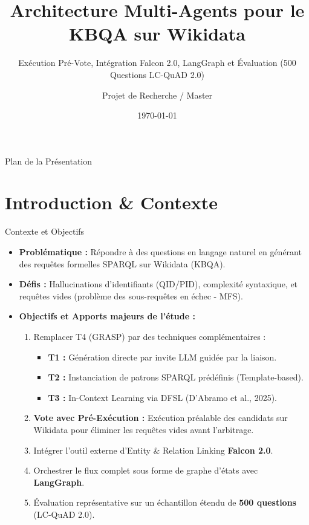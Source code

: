 \documentclass[10pt,aspectratio=169]{beamer}
\title[KBQA Multi-Agents sur Wikidata]{Architecture Multi-Agents pour le KBQA sur Wikidata}
\subtitle{Exécution Pré-Vote, Intégration Falcon 2.0, LangGraph et Évaluation (500 Questions LC-QuAD 2.0)}
\author{Projet de Recherche / Master}
\institute{Université de Dschang}
\date{\today}
\begin{document}
\begin{frame}
  \titlepage
\end{frame}

\begin{frame}{Plan de la Présentation}
  \tableofcontents
\end{frame}

\section{Introduction \& Contexte}

\begin{frame}{Contexte et Objectifs}
  \begin{itemize}
    \item \textbf{Problématique :} Répondre à des questions en langage naturel en générant des requêtes formelles SPARQL sur Wikidata (KBQA).
    \item \textbf{Défis :} Hallucinations d'identifiants (QID/PID), complexité syntaxique, et requêtes vides (problème des sous-requêtes en échec - MFS).
    \item \textbf{Objectifs et Apports majeurs de l'étude :}
      \begin{enumerate}
        \item Remplacer T4 (GRASP) par des techniques complémentaires :
          \begin{itemize}
            \item \textbf{T1 :} Génération directe par invite LLM guidée par la liaison.
            \item \textbf{T2 :} Instanciation de patrons SPARQL prédéfinis (Template-based).
            \item \textbf{T3 :} In-Context Learning via DFSL (D'Abramo et al., 2025).
          \end{itemize}
        \item \textbf{Vote avec Pré-Exécution :} Exécution préalable des candidats sur Wikidata pour éliminer les requêtes vides avant l'arbitrage.
        \item Intégrer l'outil externe d'Entity \& Relation Linking \textbf{Falcon 2.0}.
        \item Orchestrer le flux complet sous forme de graphe d'états avec \textbf{LangGraph}.
        \item Évaluation représentative sur un échantillon étendu de \textbf{500 questions} (LC-QuAD 2.0).
      \end{enumerate}
  \end{itemize}
\end{frame}
\end{document}
